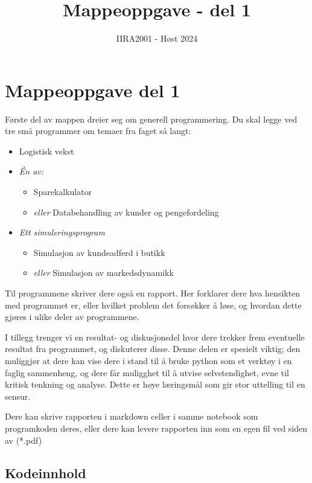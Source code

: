 \documentclass[12pt, titlepage]{article}
\begin{document}
\title{Mappeoppgave - del 1}
\author{IIRA2001 - Høst 2024}
\date{}
\maketitle

\section*{Mappeoppgave del 1}
Første del av mappen dreier seg om generell programmering.
Du skal legge ved tre små programmer om temaer fra faget så langt:
\begin{itemize}
  \item {Logistisk vekst}
  \item {\textit{Én av:}}
     \begin{itemize}
        \item {Sparekalkulator} 
        \item {\textit{eller} Databehandling av kunder og pengefordeling}
     \end{itemize}
  \item {\textit{Ett simuleringsprogram}}
     \begin{itemize}
        \item{Simulasjon av kundeadferd i butikk}
        \item{\textit{eller} Simulasjon av markedsdynamikk}
     \end{itemize}
\end{itemize}

Til programmene skriver dere også en rapport. Her forklarer dere hva hensikten med programmet er, eller hvilket
problem det forsøkker å løse, og hvordan dette gjøres i ulike deler av programmene.

I tillegg trenger vi en resultat- og diskusjonsdel hvor dere trekker frem eventuelle resultat fra programmet, og diskuterer disse.
Denne delen er spesielt viktig; den muliggjør at dere kan vise dere i stand til å bruke python som et verktøy i en faglig sammenheng, og 
dere får muligghet til å utvise selvstendighet, evne til kritisk tenkning og analyse. Dette er høye læringsmål som gir stor uttelling til en sensur.

Dere kan skrive rapporten i markdown celler i samme notebook som programkoden deres, eller dere kan levere rapporten inn som en egen fil ved siden av (*.pdf)

\subsection*{Kodeinnhold}
\end{document}
